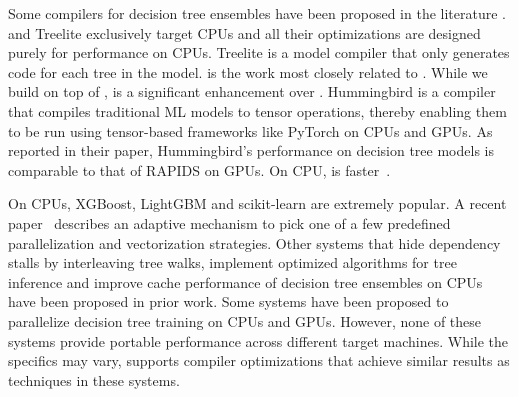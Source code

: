 Some compilers for decision tree ensembles have been proposed in the 
literature \cite{Treelite, Treebeard, Hummingbird}. \TreebeardOLD{} and Treelite
exclusively target CPUs and all their optimizations are designed purely for 
performance on CPUs. 
Treelite\cite{Treelite} is a model compiler that only  
generates  code for each tree in the model. 
\TreebeardOLD{} is the work most closely related to \Treebeard{}. While we 
build on top of \TreebeardOLD{}, \Treebeard{} is a significant enhancement 
over \TreebeardOLD{}. 
Hummingbird\cite{Hummingbird} is a compiler that compiles traditional ML models
to tensor operations, thereby enabling them to be run using tensor-based frameworks like
PyTorch\cite{PyTorch} on CPUs and GPUs. As reported in their paper, Hummingbird's performance
on decision tree models is comparable to that of RAPIDS on GPUs. On CPU, \TreebeardOLD{} 
is faster~\cite{Treebeard}.

On CPUs, XGBoost\cite{XGBoost}, LightGBM\cite{LightGBM} and
scikit-learn\cite{Sklearn} are extremely popular.
A recent paper~\cite{PACTVanLunteren} describes an adaptive mechanism 
to pick one of a few predefined parallelization and vectorization strategies.
Other systems that hide dependency stalls by interleaving tree walks\cite{VPred},
implement optimized algorithms for tree inference\cite{QuickScorer, QuickScorer1}
and improve cache performance of decision tree ensembles on CPUs\cite{CacheConscious1, CacheConscious2}
have been proposed in prior work.
Some systems have been proposed to parallelize decision tree training 
on CPUs and GPUs\cite{Jansson2014gpuRFAG, Nasridinov2013DecisionTC}.
However, none of these systems provide portable performance across different target machines.
While the specifics may vary, \Treebeard{} supports compiler optimizations that 
achieve similar results as techniques in these systems.

